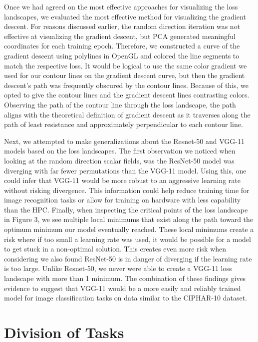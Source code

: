\documentclass{acmsiggraph}
\begin{document}
Once we had agreed on the most effective approaches for visualizing the loss landscapes, we evaluated the most effective method for visualizing the gradient descent. For reasons discussed earlier, the random direction iteration was not effective at visualizing the gradient descent, but PCA generated meaningful coordinates for each training epoch. Therefore, we constructed a curve of the gradient descent using polylines in OpenGL and colored the line segments to match the respective loss. It would be logical to use the same color gradient we used for our contour lines on the gradient descent curve, but then the gradient descent's path was frequently obscured by the contour lines. Because of this, we opted to give the contour lines and the gradient descent lines contrasting colors. Observing the path of the contour line through the loss landscape, the path aligns with the theoretical definition of gradient descent as it traverses along the path of least resistance and approximately perpendicular to each contour line.

Next, we attempted to make generalizations about the Resnet-50 and VGG-11 models based on the loss landscapes. The first observation we noticed when looking at the random direction scalar fields, was the ResNet-50 model was diverging with far fewer permutations than the VGG-11 model. Using this, one could infer that VGG-11 would be more robust to an aggressive learning rate without risking divergence. This information could help reduce training time for image recognition tasks or allow for training on hardware with less capability than the HPC. Finally, when inspecting the critical points of the loss landscape in Figure 3, we see multiple local minimums that exist along the path toward the optimum minimum our model eventually reached. These local minimums create a risk where if too small a learning rate was used, it would be possible for a model to get stuck in a non-optimal solution. This creates even more risk when considering we also found ResNet-50 is in danger of diverging if the learning rate is too large. Unlike Resnet-50, we never were able to create a VGG-11 loss landscape with more than 1 minimum. The combination of these findings gives evidence to suggest that VGG-11 would be a more easily and reliably trained model for image classification tasks on data similar to the CIPHAR-10 dataset.

\section{Division of Tasks}
\label{sec:intro}
\end{document}

